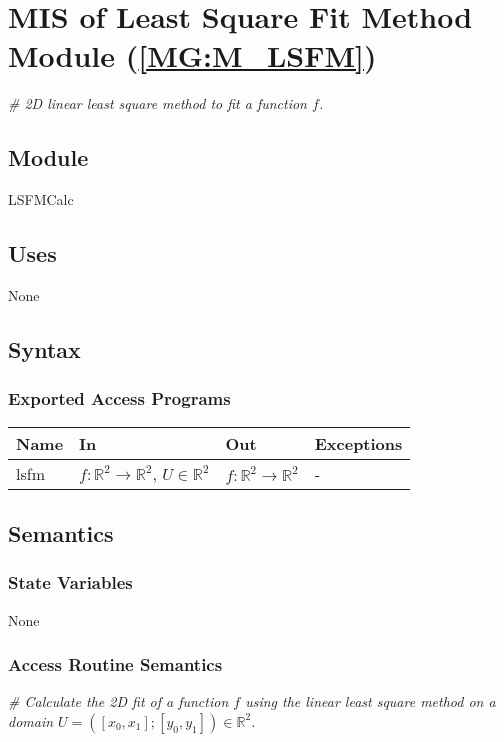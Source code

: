 \documentclass[12pt, titlepage]{article}
\begin{document}
\section{MIS of Least Square Fit Method Module 
(\texorpdfstring{\cref{MG:M_LSFM}}))} \label{MIS_LSFM}

\textit{{\#} 2D linear least square method to fit a function $f$.} \medskip

\subsection{Module}
LSFMCalc
\subsection{Uses}
None
\subsection{Syntax}

\subsubsection{Exported Access Programs}

\begin{center}
\begin{tabular}{p{2cm} p{4cm} p{4cm} p{3cm}}
\hline
\textbf{Name} & \textbf{In} & \textbf{Out} & \textbf{Exceptions} \\
\hline
lsfm & $f:\mathbb{R}^2\rightarrow\mathbb{R}^2$, $U \in \mathbb{R}^2$ & 
$f:\mathbb{R}^2\rightarrow\mathbb{R}^2$ & - \\
\hline
\end{tabular}
\end{center}

\subsection{Semantics}

\subsubsection{State Variables}
None

\subsubsection{Access Routine Semantics}

\noindent\textit{{\#} Calculate the 2D fit of a function $f$ using the linear 
least square method on a domain $U=([x_0,x_1];[y_0,y_1]) \in \mathbb{R}^2$.} 
\medskip
\end{document}
